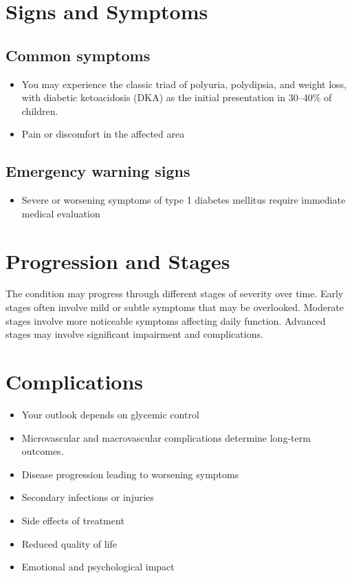 \section{Signs and Symptoms}

\subsection{Common symptoms}
\begin{itemize}[noitemsep]
  \item You may experience the classic triad of polyuria, polydipsia, and weight loss, with diabetic ketoacidosis (DKA) as the initial presentation in 30--40\% of children.
  \item Pain or discomfort in the affected area
  \end{itemize}

\subsection{Emergency warning signs}
\begin{itemize}[noitemsep]
  \item Severe or worsening symptoms of type 1 diabetes mellitus require immediate medical evaluation
\end{itemize}
\section{Progression and Stages}
The condition may progress through different stages of severity over time. Early stages often involve mild or subtle symptoms that may be overlooked. Moderate stages involve more noticeable symptoms affecting daily function. Advanced stages may involve significant impairment and complications.
\section{Complications}
\begin{itemize}[noitemsep]
  \item Your outlook depends on glycemic control
  \item Microvascular and macrovascular complications determine long-term outcomes.
  \item Disease progression leading to worsening symptoms
  \item Secondary infections or injuries
  \item Side effects of treatment
  \item Reduced quality of life
  \item Emotional and psychological impact
\end{itemize}
